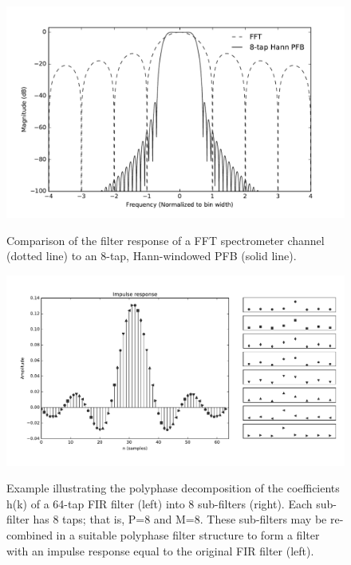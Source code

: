 \documentclass{ws-rv961x669}
\begin{document}
\begin{figure}
 \centering
 \includegraphics[width=\textwidth]{./figures/pfb_resp}
 \label{fig:pfb_response}
 \caption{Comparison of the filter response of a FFT spectrometer channel (dotted line) to an 8-tap, Hann-windowed PFB (solid line).}
\end{figure}

\begin{figure}
 \centering
 \includegraphics[width=\textwidth]{./figures/pfb_taps}
 \label{fig:pfb_taps}
 \caption{Example illustrating the polyphase decomposition of the coefficients h(k) of a 64-tap FIR filter (left) into 8 sub-filters (right). Each sub-filter has 8 taps; that is, P=8 and M=8. These sub-filters may be re-combined in a suitable polyphase filter structure to form a filter with an impulse response equal to the original FIR filter (left).}
\end{figure}
\end{document}

